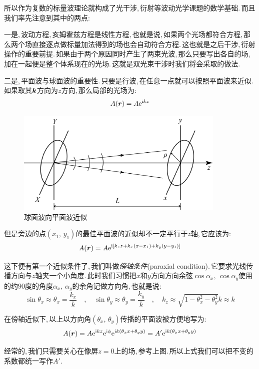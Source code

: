 所以作为复数的标量波理论就构成了光干涉,\,衍射等波动光学课题的数学基础.\,而且我们率先注意到其中的两点:


一是,\,波动方程,\,亥姆霍兹方程是线性方程,\,也就是说,\,如果两个光场都符合方程,\,那么两个场直接逐点做标量加法得到的场也会自动符合方程.\,这也就是之后干涉,\,衍射操作的重要前提.\,如果由于两个原因同时产生了两束光波,\,那么只要写出各自的场,\,加在一起便是整个体系现在的光场.\,这就是双光束干涉时我们将会采取的做法.


二是,\,平面波与球面波的重要性.\,只要是行波,\,在任意一点就可以按照平面波来近似.\,如果取其$\boldsymbol{k}$方向为$z$方向,\,那么局部的光场为:
\[A(\boldsymbol{r})=A{\rm e}^{{\rm i} kz}\]

\begin{figure}
\centering
\vspace{-0.1cm}
\includegraphics[width=10cm]{image/14-1-2.png}
\caption{球面波向平面波近似}
\end{figure}
但是旁边的点$(x_1,\,y_1)$的最佳平面波的近似却不一定平行于$z$轴,\,它应该为:
\[A(\boldsymbol{r})=A{\rm e}^{{\rm i} [k_z z+k_x (x-x_1)+k_y (y-y_1)]}\]

这下便有第一个近似条件了,\,我们叫做\emph{傍轴条件}(paraxial condition).\,它要求光线传播方向与$z$轴夹一个小角度.\,此时我们习惯把$x$和$y$方向方向余弦$\cos \alpha_x,\,\cos\alpha_y$使用的约$90$度的角度$\alpha_x,\,\alpha_y$的余角记做方向角,\,也就是说:
\[\sin \theta_x\approx \theta_x=\frac{k_x}{k}\quad,\quad \sin \theta_y\approx \theta_y=\frac{k_y}{k}\quad,\quad k_z\approx \sqrt{1-\theta^2_x-\theta^2_y}k\approx k\]

在傍轴近似下,\,以上以方向角$(\theta_x,\,\theta_y)$传播的平面波被方便地写为:
\[A(\boldsymbol{r})=A{\rm e}^{{\rm i} k z}{\rm e}^{{\rm i}\phi}{\rm e}^{{\rm i} k (\theta_x x+\theta_y y)}=A'{\rm e}^{{\rm i} k (\theta_x x+\theta_y y)}\]

经常的,\,我们只需要关心在像屏$z=0$上的场,\,参考上图.\,所以上式我们可以把不变的系数都统一写作$A'$.

